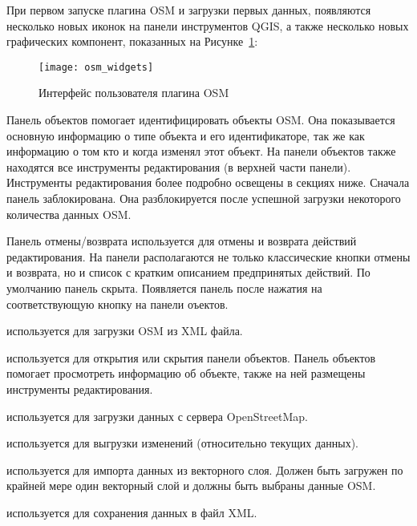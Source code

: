 При первом запуске плагина OSM и загрузки первых данных, появляются
несколько новых иконок на панели инструментов QGIS, а также несколько
новых графических компонент, показанных на Рисунке~\ref{fig:osmwidget}:

\begin{figure}[ht]
   \centering
   \texttt{[image: osm\_widgets]}
   \caption{Интерфейс пользователя плагина OSM \wincaption}\label{fig:osmwidget}
\end{figure}


Панель объектов помогает идентифицировать объекты OSM. Она показывается
основную информацию о типе объекта и его идентификаторе, так же как
информацию о том кто и когда изменял этот объект. На панели объектов
также находятся все инструменты редактирования (в верхней части панели).
Инструменты редактирования более подробно освещены в секциях ниже.
Сначала панель заблокирована. Она разблокируется после успешной загрузки
некоторого количества данных OSM.


Панель отмены/возврата используется для отмены и возврата действий
редактирования. На панели располагаются не только классические кнопки
отмены и возврата, но и список с кратким описанием предпринятых действий.
По умолчанию панель скрыта. Появляется панель после нажатия на
соответствующую кнопку на панели оъектов.


\begin{description}
\item {} используется для
загрузки OSM из XML файла.
\item {}
используется для открытия или скрытия панели объектов. Панель объектов
помогает просмотреть информацию об объекте, также на ней размещены
инструменты редактирования.
\item {}
используется для загрузки данных с сервера OpenStreetMap.
\item {} используется для
выгрузки изменений (относительно текущих данных).
\item {}
используется для импорта данных из векторного слоя. Должен быть загружен
по крайней мере один векторный слой и должны быть выбраны данные OSM.
\item {} используется для
сохранения данных в файл XML.
\end{description}

